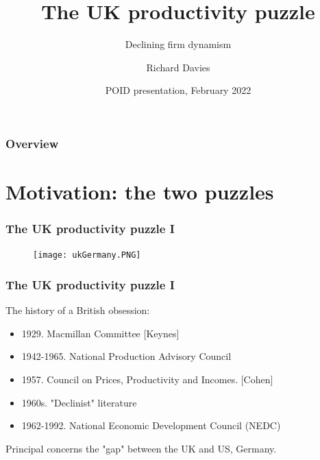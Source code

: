 \documentclass{beamer}
\title[UK productivity] %
{The UK productivity puzzle}
\subtitle{Declining firm dynamism}
\author[Richard Davies] %
{Richard Davies}
\institute[] %
{
  Economics Observatory\\
  U Bristol and CEP
}
\date[Declining dynamism] %
{POID presentation, February 2022}
\begin{document}
\frame{\titlepage}


\begin{frame}
\frametitle{Overview}
\tableofcontents
\end{frame}



\section{Motivation: the two puzzles}


\begin{frame}
\frametitle{The UK productivity puzzle I}

\begin{figure}
\centering
\texttt{[image: ukGermany.PNG]}
\end{figure}

\href{https://cep.lse.ac.uk/pubs/download/special/cepsp34.pdf}{}

\end{frame}

\begin{frame}
\frametitle{The UK productivity puzzle I}

The history of a British obsession:
\vspace{0.3cm}
 
\begin{itemize}
\item 1929. Macmillan Committee [Keynes]
\item 1942-1965. National Production Advisory Council
\item 1957. Council on Prices, Productivity and Incomes. [Cohen]
\item 1960s. "Declinist" literature
\item 1962-1992. National Economic Development Council (NEDC) 
\end{itemize}

\vspace{0.3cm}
Principal concerns the "gap" between the UK and US, Germany.
\vspace{0.3cm}


\end{frame}
\end{document}
